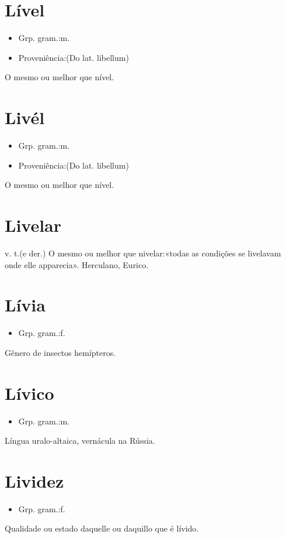 \section{Lível}
\begin{itemize}
\item {Grp. gram.:m.}
\end{itemize}
\begin{itemize}
\item {Proveniência:(Do lat. \textunderscore libellum\textunderscore )}
\end{itemize}
O mesmo ou melhor que \textunderscore nível\textunderscore .
\section{Livél}
\begin{itemize}
\item {Grp. gram.:m.}
\end{itemize}
\begin{itemize}
\item {Proveniência:(Do lat. \textunderscore libellum\textunderscore )}
\end{itemize}
O mesmo ou melhor que \textunderscore nível\textunderscore .
\section{Livelar}
\textunderscore v. t.\textunderscore  (e der.)
O mesmo ou melhor que \textunderscore nivelar\textunderscore :«\textunderscore todas as condições se livelavam onde elle apparecia\textunderscore ». Herculano, \textunderscore Eurico\textunderscore .
\section{Lívia}
\begin{itemize}
\item {Grp. gram.:f.}
\end{itemize}
Gênero de insectos hemípteros.
\section{Lívico}
\begin{itemize}
\item {Grp. gram.:m.}
\end{itemize}
Língua uralo-altaica, vernácula na Rússia.
\section{Lividez}
\begin{itemize}
\item {Grp. gram.:f.}
\end{itemize}
Qualidade ou estado daquelle ou daquillo que é lívido.
